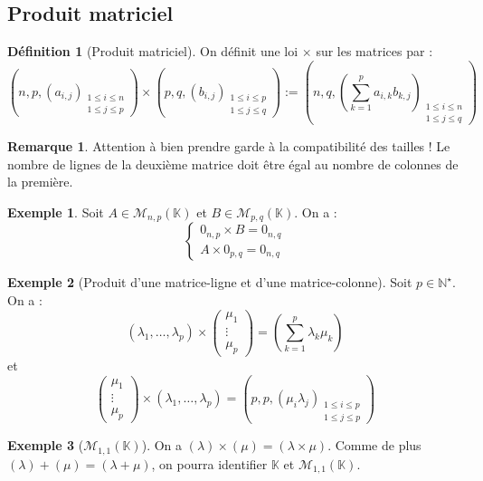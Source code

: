 \documentclass[french]{book}
\newcommand{\N}{\mathbb{N}}
\newcommand{\K}{\mathbb{K}}
\newcommand{\st}{^\star}
\theoremstyle{plain}
\theoremstyle{definition}
\newtheorem{dfn}{Définition}[chapter]
\newtheorem{exa}{Exemple}[chapter]
\newtheorem{rmq}{Remarque}[chapter]
\theoremstyle{remark}
\begin{document}
\subsection{Produit matriciel}
\begin{dfn}[Produit matriciel]
	On définit une loi $\times$ sur les matrices par : $$\left(n,p,(a_{i,j})_{\substack{1\leqslant i\leqslant n \\ 1\leqslant j\leqslant p}}\right)\times\left(p,q,(b_{i,j})_{\substack{1\leqslant i\leqslant p \\ 1\leqslant j\leqslant q}}\right):=\left(n,q,\left(\sum_{k=1}^{p}a_{i,k}b_{k,j}\right)_{\substack{1\leqslant i\leqslant n \\ 1\leqslant j\leqslant q}}\right)$$
\end{dfn}
\begin{rmq}
	Attention à bien prendre garde à la compatibilité des tailles ! Le nombre de lignes de la deuxième matrice doit être égal au nombre de colonnes de la première.
\end{rmq}
\begin{exa}
	Soit $A\in\mathcal{M}_{n,p}(\K)$ et $B\in\mathcal{M}_{p,q}(\K)$. On a : $$\begin{cases}
		0_{n,p}\times B=0_{n,q} \\ A\times 0_{p,q}=0_{n,q}
	\end{cases}$$
\end{exa}
\begin{exa}[Produit d'une matrice-ligne et d'une matrice-colonne]
	Soit $p\in\N\st$. On a : $$(\lambda_1,\ldots,\lambda_p)\times\begin{pmatrix}	\mu_1\\ \vdots \\ \mu_p\end{pmatrix}=\left(\sum_{k=1}^{p}\lambda_k\mu_k\right)$$ et $$\begin{pmatrix}	\mu_1\\ \vdots \\ \mu_p\end{pmatrix}\times(\lambda_1,\ldots,\lambda_p)=\left(p,p,\left(\mu_i\lambda_j\right)_{\substack{1\leqslant i\leqslant p\\ 1\leqslant j\leqslant p}}\right)$$
\end{exa}
\begin{exa}[$\mathcal{M}_{1,1}(\K)$]
	On a $(\lambda)\times(\mu)=(\lambda\times\mu)$. Comme de plus $(\lambda)+(\mu)=(\lambda+\mu)$, on pourra identifier $\K$ et $\mathcal{M}_{1,1}(\K)$.
\end{exa}
\end{document}
